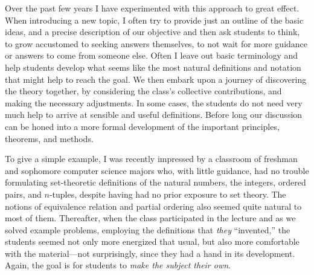 Over the past few years I have experimented with this approach to great effect.  When introducing a new topic, I often try to provide just an outline of the basic ideas, and a precise description of our objective and then ask students to think, to grow accustomed to seeking answers themselves, to not wait for more guidance or answers to come from someone else. Often I leave out basic terminology and help students develop what seems like the most natural definitions and notation that might help to reach the goal. We then embark upon a journey of discovering the theory together, by considering the class's collective contributions, and making the necessary adjustments. In some cases, the students do not need very much help to arrive at sensible and useful definitions. Before long our discussion can be honed into a more formal development of the important principles, theorems, and methods.

To give a simple example, I was recently impressed by a classroom of freshman and sophomore computer science majors who, with little guidance, had no trouble formulating set-theoretic definitions of the natural numbers, the integers, ordered pairs, and $n$-tuples, despite having had no prior exposure to set theory. The notions of equivalence relation and partial ordering also seemed quite natural to most of them. Thereafter, when the class participated in the lecture and as we solved example problems, employing the definitions that \emph{they} ``invented,'' the students seemed not only more energized that usual, but also  more comfortable with the material---not surprisingly, since they had a hand in its development. Again, the goal is for students to \emph{make the subject their own}.  


